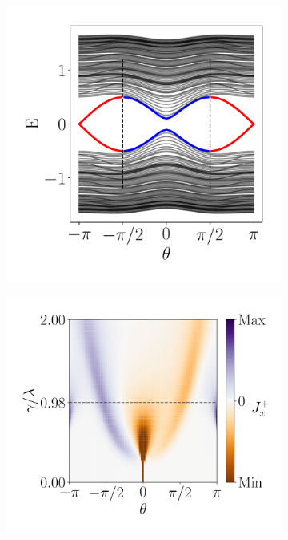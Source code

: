 \begin{figure}[h!]
     \centering
    \captionsetup[sub]{font=small}
     \begin{minipage}[h!]{1\textwidth}
         \begin{subfigure}[b!]{0.3 \textwidth}
             \caption{}
             \includegraphics[width=\textwidth]{Imagenes/Resultados_pump_Cuadrado/x/param_pump_A=0.5x.pdf}
         \end{subfigure}\hspace*{-0.5em}
         \begin{subfigure}[b!]{0.35 \textwidth}
             \caption{}
             \includegraphics[width=\textwidth]{Imagenes/Resultados_pump_Cuadrado/x/current_square_pumpx.pdf}

\end{subfigure}
\end{minipage}
\end{figure}
